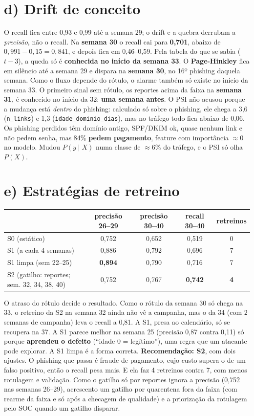 \documentclass[10pt,a4paper]{article}
\newcommand{\code}[1]{\texttt{\small #1}}
\begin{document}
\section*{d) Drift de conceito}
O recall fica entre 0,93 e 0,99 até a semana 29; o drift e a quebra derrubam a \emph{precisão}, não o recall. Na \textbf{semana 30} o recall cai para \textbf{0,701}, abaixo de $0{,}991-0{,}15=0{,}841$, e depois fica em 0,46--0,59. Pela tabela do que se sabia ($t-3$), a queda só é \textbf{conhecida no início da semana 33}.
O \textbf{Page-Hinkley} fica em silêncio até a semana 29 e dispara na \textbf{semana 30}, no 16º phishing daquela semana. Como o fluxo depende do rótulo, o alarme também só existe no início da semana 33.
O primeiro sinal sem rótulo, os reportes acima da faixa na \textbf{semana 31}, é conhecido no início da 32: \textbf{uma semana antes}.
O PSI não acusou porque a mudança está \emph{dentro} do phishing: calculado só sobre o phishing, ele chega a 3,6 (\code{n\_links}) e 1,3 (\code{idade\_dominio\_dias}), mas no tráfego todo fica abaixo de 0,06. Os phishing perdidos têm domínio antigo, SPF/DKIM ok, quase nenhum link e não pedem senha, mas 84\% \textbf{pedem pagamento}, feature com importância $\approx$0 no modelo. Mudou $P(y\mid X)$ numa classe de $\approx$6\% do tráfego, e o PSI só olha $P(X)$.

\section*{e) Estratégias de retreino}
\begin{center}
\footnotesize
\begin{tabular}{lcccc}
\toprule
 & precisão 26--29 & precisão 30--40 & recall 30--40 & retreinos \\
\midrule
S0 (estático) & 0,752 & 0,652 & 0,519 & 0 \\
S1 (a cada 4 semanas) & 0,886 & 0,792 & 0,696 & 7 \\
S1 limpa (sem 22--25) & \textbf{0,894} & 0,790 & 0,716 & 7 \\
S2 (gatilho: reportes; sem. 32, 34, 38, 40) & 0,752 & 0,767 & \textbf{0,742} & \textbf{4} \\
\bottomrule
\end{tabular}
\end{center}
\vspace{-3pt}
O atraso do rótulo decide o resultado. Como o rótulo da semana 30 só chega na 33, o retreino da S2 na semana 32 ainda não vê a campanha, mas o da 34 (com 2 semanas de campanha) leva o recall a 0,81. A S1, presa ao calendário, só se recupera na 37.
A S1 parece melhor na semana 25 (precisão 0,87 contra 0,11) só porque \textbf{aprendeu o defeito} (``idade 0 = legítimo''), uma regra que um atacante pode explorar. A S1 limpa é a forma correta.
\textbf{Recomendação: S2}, com dois ajustes. O phishing que passa é fraude de pagamento, cujo custo supera o de um falso positivo, então o recall pesa mais. E ela faz 4 retreinos contra 7, com menos rotulagem e validação. Como o gatilho só por reportes ignora a precisão (0,752 nas semanas 26--29), acrescento um gatilho por quarentena fora da faixa (com rearme da faixa e só após a checagem de qualidade) e a priorização da rotulagem pelo SOC quando um gatilho disparar.
\end{document}
